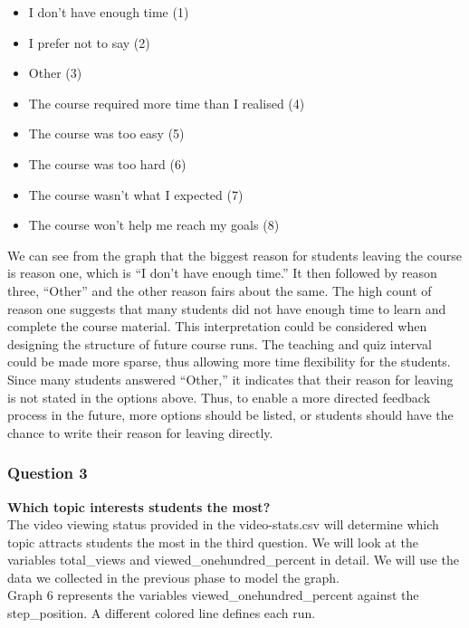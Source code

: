 \documentclass[12pt,]{article}
\providecommand{\tightlist}{%
\setlength{\itemsep}{0pt}\setlength{\parskip}{0pt}}
\begin{document}
\begin{itemize}
\tightlist
\item
  I don't have enough time (1)
\item
  I prefer not to say (2)
\item
  Other (3)
\item
  The course required more time than I realised (4)
\item
  The course was too easy (5)
\item
  The course was too hard (6)
\item
  The course wasn't what I expected (7)
\item
  The course won't help me reach my goals (8)
\end{itemize}

\noindent We can see from the graph that the biggest reason for students
leaving the course is reason one, which is ``I don't have enough time.''
It then followed by reason three, ``Other'' and the other reason fairs
about the same. The high count of reason one suggests that many students
did not have enough time to learn and complete the course material. This
interpretation could be considered when designing the structure of
future course runs. The teaching and quiz interval could be made more
sparse, thus allowing more time flexibility for the students. Since many
students answered ``Other,'' it indicates that their reason for leaving
is not stated in the options above. Thus, to enable a more directed
feedback process in the future, more options should be listed, or
students should have the chance to write their reason for leaving
directly.

\hypertarget{question-3-1}{%
\subsubsection{Question 3}\label{question-3-1}}

\textbf{Which topic interests students the most?}\\
\hfill\break The video viewing status provided in the video-stats.csv
will determine which topic attracts students the most in the third
question. We will look at the variables total\_views and
viewed\_onehundred\_percent in detail. We will use the data we collected
in the previous phase to model the graph.\\
\hfill\break Graph 6 represents the variables
viewed\_onehundred\_percent against the step\_position. A different
colored line defines each run.
\end{document}
